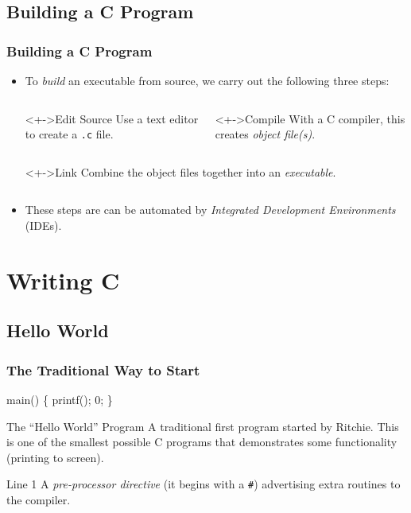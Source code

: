 \documentclass[smaller,handout,table]{beamer}
\begin{document}
\subsection{Building a C Program}
\begin{frame}
\frametitle{Building a C Program}
\begin{itemize}
\item To \emph{build} an executable from source, we carry out the following
three steps:
\begin{columns}
\begin{column}{3.1cm}
\begin{block}<+->{Edit Source}
Use a text editor to create a {\tt .c} file.
\end{block}
\end{column}
\begin{column}{3.8cm}
\begin{block}<+->{Compile}
With a C compiler, this creates \emph{object file(s)}.
\end{block}
\end{column}
\end{columns}
\begin{columns}
\begin{column}{3.8cm}
\begin{block}<+->{Link}
Combine the object files together into an \emph{executable}.
\end{block}
\end{column}
\end{columns}
\vspace{0.2in}
\item<+-> These steps are can be automated by \emph{Integrated Development Environments}
(IDEs).
\end{itemize}
\end{frame}

\section{Writing C}
\subsection{Hello World}
\ifhandout
\begin{frame}[fragile]
\frametitle{The Traditional Way to Start}
\begin{semiverbatim}
\kr\kl{} 
\kl
\kl{} main()
\kl\{
\kl   printf();
\kl   {} 0;
\kl\}
\end{semiverbatim}

\begin{block}{The ``Hello World'' Program}
A traditional first program started by Ritchie. This is one of the smallest possible C programs that demonstrates some functionality (printing to screen).
\end{block}

\begin{block}{Line 1}
A \emph{pre-processor directive} (it begins with a {\tt \#}) advertising extra routines to the compiler.
\end{block}
\end{frame}
\end{document}
